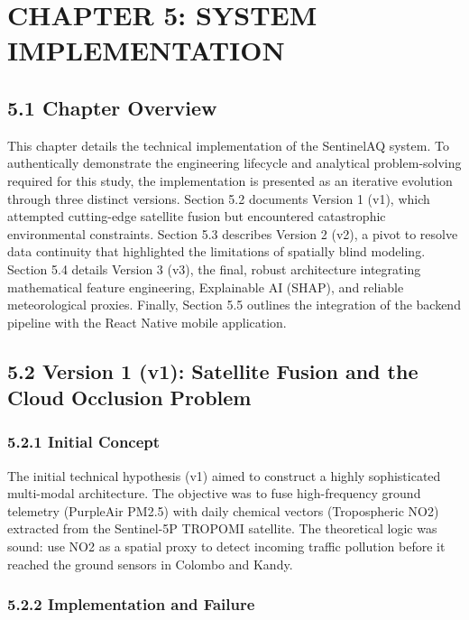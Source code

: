 \chapter{CHAPTER 5: SYSTEM
IMPLEMENTATION}\label{chapter-5-system-implementation}

\section{5.1 Chapter Overview}\label{chapter-overview}

This chapter details the technical implementation of the SentinelAQ
system. To authentically demonstrate the engineering lifecycle and
analytical problem-solving required for this study, the implementation
is presented as an iterative evolution through three distinct versions.
Section 5.2 documents Version 1 (v1), which attempted cutting-edge
satellite fusion but encountered catastrophic environmental constraints.
Section 5.3 describes Version 2 (v2), a pivot to resolve data continuity
that highlighted the limitations of spatially blind modeling. Section
5.4 details Version 3 (v3), the final, robust architecture integrating
mathematical feature engineering, Explainable AI (SHAP), and reliable
meteorological proxies. Finally, Section 5.5 outlines the integration of
the backend pipeline with the React Native mobile application.

\section{5.2 Version 1 (v1): Satellite Fusion and the Cloud Occlusion
Problem}\label{version-1-v1-satellite-fusion-and-the-cloud-occlusion-problem}

\subsection{5.2.1 Initial Concept}\label{initial-concept}

The initial technical hypothesis (v1) aimed to construct a highly
sophisticated multi-modal architecture. The objective was to fuse
high-frequency ground telemetry (PurpleAir PM2.5) with daily chemical
vectors (Tropospheric NO2) extracted from the Sentinel-5P TROPOMI
satellite. The theoretical logic was sound: use NO2 as a spatial proxy
to detect incoming traffic pollution before it reached the ground
sensors in Colombo and Kandy.

\subsection{5.2.2 Implementation and
Failure}\label{implementation-and-failure}

